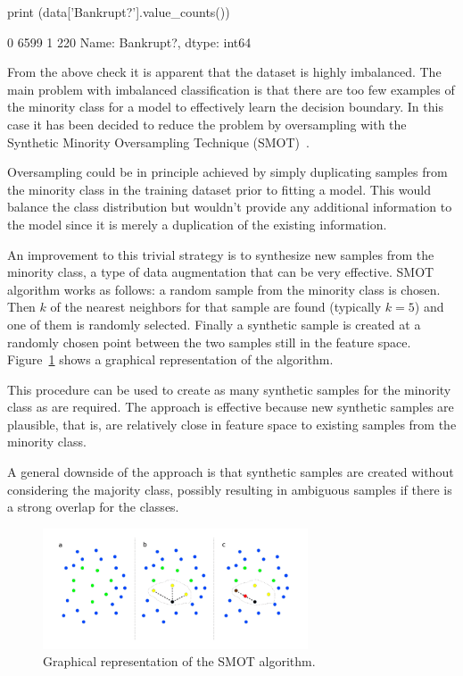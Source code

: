 \begin{ipython}
print (data['Bankrupt?'].value_counts())
\end{ipython}
\begin{ioutput}
0    6599
1     220
Name: Bankrupt?, dtype: int64
\end{ioutput}

From the above check it is apparent that the dataset is highly imbalanced. The main problem with imbalanced classification is that there are too few examples of the minority class for a model to effectively learn the decision boundary. In this case it has been decided to reduce the problem by oversampling with the Synthetic Minority Oversampling Technique (SMOT)~\cite{bib:smot}. 

\begin{attention}
Oversampling could be in principle achieved by simply duplicating samples from the minority class in the training dataset prior to fitting a model. This would balance the class distribution but wouldn't provide any additional information to the model since it is merely a duplication of the existing information.
	
An improvement to this trivial strategy is to synthesize new samples from the minority class, a type of data augmentation that can be very effective.
SMOT algorithm works as follows: a random sample from the minority class is chosen. Then $k$ of the nearest neighbors for that sample are found (typically $k=5$) and one of them is randomly selected. Finally a synthetic sample is created at a randomly chosen point between the two samples still in the feature space.
Figure~\ref{fig:smote} shows a graphical representation of the algorithm.

This procedure can be used to create as many synthetic samples for the minority class as are required. 
The approach is effective because new synthetic samples are plausible, that is, are relatively close in feature space to existing samples from the minority class.

A general downside of the approach is that synthetic samples are created without considering the majority class, possibly resulting in ambiguous samples if there is a strong overlap for the classes.
\end{attention}

\begin{figure}[htb]
\centering
\includegraphics[width=0.7\textwidth]{figures/smote}
\caption{Graphical representation of the SMOT algorithm.}
\label{fig:smote}
\end{figure}

